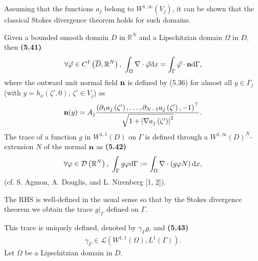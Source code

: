 \documentclass{book}
\numberwithin{equation}{section}
\begin{document}
\begin{enumerate}
\begin{enumerate}
        Assuming that the functions $a_j$ belong to $W^{1,\infty}(V_j)$, it can be shown that the classical Stokes divergence theorem holds for such domains.
        
        Given a bounded smooth domain $D$ in $\mathbb{R}^N$ and a Lipschitzian domain $\Omega$ in $D$, then \textbf{(5.41)}
        \begin{align*}
            \forall\vec{\varphi}\in C^1\left(\overline{D},\mathbb{R}^N\right),\ \int_\Omega \nabla\cdot\vec{\varphi}{\rm d}x = \int_\Gamma \vec{\varphi}\cdot{\bf n}{\rm d}\Gamma,
        \end{align*}
        where the outward unit normal field ${\bf n}$ is defined by (5.36) for almost all $y\in\Gamma_j$ (with $y = h_x\left(\zeta',0\right)$, $\zeta'\in V_j$) as
        \begin{align*}
            {\bf n}(y) = A_j\frac{\left(\partial_1a_j\left(\zeta'\right),\ldots,\partial_{N - 1}a_j\left(\zeta'\right),-1\right)^\top}{\sqrt{1 + \left|\nabla a_j\left(\zeta'\right)\right|^2}}.
        \end{align*}
        The trace of a function $g$ in $W^{1,1}(D)$ on $\Gamma$ is defined through a $W^{1,\infty}(D)^N$-extension $N$ of the normal ${\bf n}$ as \textbf{(5.42)}
        \begin{align*}
            \forall\varphi\in\mathcal{D}\left(\mathbb{R}^N\right),\ \int_\Gamma g\varphi{\rm d}\Gamma := \int_\Omega \nabla\cdot\left(g\varphi N\right){\rm d}x,
        \end{align*}
        (cf. S. Agmon, A. Douglis, and L. Nirenberg [1, 2]).
        
        The RHS is well-defined in the usual sense so that by the Stokes divergence theorem we obtain the trace $g|_\Gamma$ defined on $\Gamma$.
        
        This trace is uniquely defined, denoted by $\gamma_\Gamma g$, and \textbf{(5.43)}
        \begin{align*}
            \gamma_\Gamma\in\mathcal{L}\left(W^{1,1}(\Omega),L^1(\Gamma)\right).
        \end{align*}
        Let $\Omega$ be a Lipschitzian domain in $D$.
    \end{enumerate}
\end{enumerate}
\end{document}
